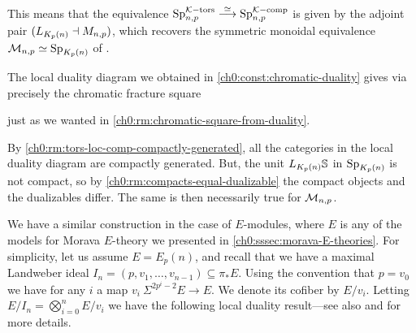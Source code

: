 \begin{remark}
    This means that the equivalence $\mathrm{Sp}_{n,p}^{\mathcal{K}-\mathrm{tors}}\overset{\simeq}\longrightarrow \mathrm{Sp}_{n,p}^{\mathcal{K}-\mathrm{comp}}$ is given by the adjoint pair $(L_{{K_p(n)}}\dashv M_{n,p})$, which recovers the symmetric monoidal equivalence $\mathcal{M}_{n,p} \simeq \mathrm{Sp}_{{K_p(n)}}$ of \cite[6.19]{hovey-strickland_99}. 
\end{remark}

\begin{remark}
    The local duality diagram we obtained in \cref{ch0:const:chromatic-duality} gives via \cite[2.26]{barthel-heard-valenzuela_2018} precisely the chromatic fracture square
    \begin{center}
    \end{center}
    just as we wanted in \cref{ch0:rm:chromatic-square-from-duality}.   
\end{remark}

\begin{remark}
    By \cref{ch0:rm:tors-loc-comp-compactly-generated}, all the categories in the local duality diagram are compactly generated. But, the unit $L_{{K_p(n)}}\mathbb{S}$ in $\mathrm{Sp}_{{K_p(n)}}$ is not compact, so by \cref{ch0:rm:compacts-equal-dualizable} the compact objects and the dualizables differ. The same is then necessarily true for $\mathcal{M}_{n,p}$.
\end{remark}

We have a similar construction in the case of $E$-modules, where $E$ is any of the models for Morava $E$-theory we presented in \cref{ch0:sssec:morava-E-theories}. For simplicity, let us assume $E= E_p(n)$, and recall that we have a maximal Landweber ideal $I_n = (p, v_1, \ldots, v_{n-1})\subseteq  \pi_* E$. Using the convention that $p = v_0$ we have for any $i$ a map $v_i \: \Sigma^{2p^i-2} E \to E$. We denote its cofiber by $E/v_i$. Letting $E/I_n = \bigotimes_{i=0}^n E/v_i$ we have the following local duality result---see also \cite{greenlees-may_1995} and \cite[Section 3.1]{barthel-heard-valenzuela_2018} for more details. 

